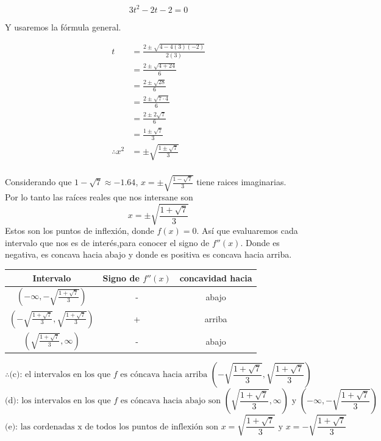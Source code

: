 \documentclass[12pt]{article}
\begin{document}
\[ 3t^{2} - 2t - 2 = 0 \]

Y usaremos la fórmula general.

 \begin{equation*}
  \begin{split}
    t
    &=  \frac{2 \pm \sqrt{4-4(3)(-2)} }{2(3)}  \\
    &=  \frac{2 \pm \sqrt{4+24} }{6}  \\
    &=  \frac{2 \pm \sqrt{28} }{6}  \\
    &=  \frac{2 \pm \sqrt{7 \cdot 4} }{6}  \\
    &=  \frac{2 \pm 2 \sqrt{7} }{6}  \\
    &=  \frac{1 \pm \sqrt{7} }{3}  \\
    \therefore
    x^{2}
    &= \pm \sqrt { \frac {1 \pm \sqrt { 7 } } { 3 }  } \\
  \end{split}
 \end{equation*}

Considerando que $1 -  \sqrt{7} \approx -1.64$, $x = \pm \sqrt {\frac{1 - \sqrt{7}}{3}}$ tiene raices imaginarias.\\
Por lo tanto las raíces reales que nos intersane son
  \[
  x = \pm \sqrt {\frac{1 + \sqrt{7} }{3}} 
  \]
Estos son los puntos de inflexión, donde $f(x) = 0$. Así que evaluaremos cada intervalo que nos es de interés,para conocer el signo de $ f''(x) $. Donde es negativa, es concava hacia abajo y donde es positiva es concava hacia arriba.
  
\begin{table}[h]
\centering
\begin{tabular}{|c|c|c|}
\hline
Intervalo &  Signo de $f''(x)$ & concavidad hacia \\
\hline
$(-\infty, -\sqrt{\frac{1 + \sqrt{7}}{3}})$ & - & abajo\\
\hline
$(-\sqrt{\frac{1 + \sqrt{7}}{3}}, \sqrt{\frac{1 + \sqrt{7}}{3}})$ & + & arriba \\
\hline
$(\sqrt{\frac{1 + \sqrt{7}}{3}}, \infty)$ & - & abajo \\
\hline
\end{tabular}
\end{table}

 \[
 \therefore
 \text{(c):  el intervalos  en los que $f$ es cóncava hacia arriba } (-\sqrt{\frac{1 + \sqrt{7}}{3}}, \sqrt{\frac{1 + \sqrt{7}}{3}})
   \]
\[
  \text {(d):  los  intervalos en los que $f$  es cóncava hacia abajo  son }  (\sqrt{\frac{1 + \sqrt{7}}{3}}, \infty) \text{ y } (-\infty, -\sqrt{\frac{1 + \sqrt{7}}{3}})

    \]
\[
  \text {(e): las cordenadas x de todos los puntos de inflexión son }  x =  \sqrt {\frac{1 + \sqrt{7} }{3}}  \text{ y }  x = - \sqrt {\frac{1 + \sqrt{7} }{3}} 

    \]
\end{document}
